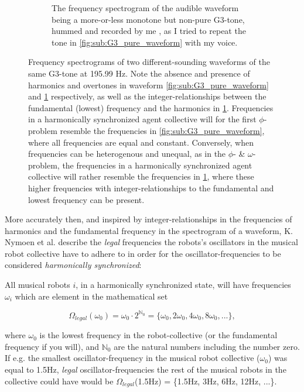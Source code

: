 \begin{figure}[ht!]
\begin{subfigure}[t]{.5\textwidth}
			\caption{The frequency spectrogram of the audible waveform being a more-or-less monotone but non-pure G3-tone, hummed and recorded by me \cite{}, as I tried to repeat the tone in \ref{fig:sub:G3_pure_waveform} with my voice.}
			\label{fig:sub:G3_hummed_waveform}
		\end{subfigure}
	\caption[Frequency spectrograms illustrating the absence and presence of harmonics and overtones in audible waveforms]{Frequency spectrograms of two different-sounding waveforms of the same G3-tone at 195.99 Hz. Note the absence and presence of harmonics and overtones in waveform \ref{fig:sub:G3_pure_waveform} and \ref{fig:sub:G3_hummed_waveform} respectively, as well as the integer-relationships between the fundamental (lowest) frequency and the harmonics in \ref{fig:sub:G3_hummed_waveform}. Frequencies in a harmonically synchronized agent collective will for the first $\phi$-problem resemble the frequencies in \ref{fig:sub:G3_pure_waveform}, where all frequencies are equal and constant. Conversely, when frequencies can be heterogenous and unequal, as in the $\phi$- \& $\omega$-problem, the frequencies in a harmonically synchronized agent collective will rather resemble the frequencies in \ref{fig:sub:G3_hummed_waveform}, where these higher frequencies with integer-relationships to the fundamental and lowest frequency can be present.}
	\label{fig:frequency_spectrograms}
\end{figure}

More accurately then, and inspired by integer-relationships in the frequencies of harmonics and the fundamental frequency in the spectrogram of a waveform, K. Nymoen et al. \cite{nymoen_synch} describe the \textit{legal} frequencies the robots's oscillators in the musical robot collective have to adhere to in order for the oscillator-frequencies to be considered \textit{harmonically synchronized}:

All musical robots $i$, in a harmonically synchronized state, will have frequencies $\omega_i$ which are element in the mathematical set

\begin{equation}\label{legal_freqs}
\Omega_{legal}(\omega_0) = \omega_{0} \cdot 2^{\mathbb{N}_0} = \{\omega_{0}, 2\omega_{0}, 4\omega_{0}, 8\omega_{0}, ...\} ,
\end{equation}

where $\omega_{0}$ is the lowest frequency in the robot-collective (or the fundamental frequency if you will), and $\mathbb{N}_0$ are the natural numbers including the number zero. If e.g. the smallest oscillator-frequency in the musical robot collective ($\omega_0$) was equal to 1.5Hz, \textit{legal} oscillator-frequencies the rest of the musical robots in the collective could have would be $\Omega_{legal}$(1.5Hz) = \{1.5Hz, 3Hz, 6Hz, 12Hz, ...\}.

